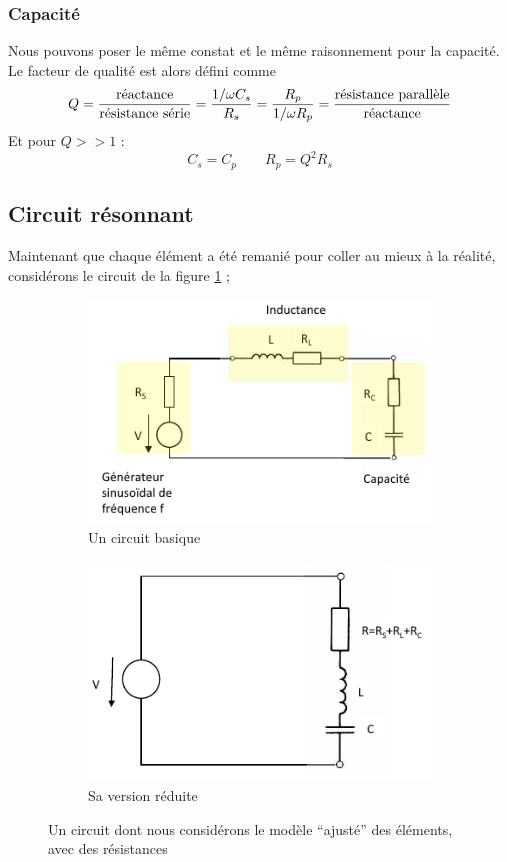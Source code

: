 \documentclass[12pt,a4paper]{article}
\begin{document}
\subsubsection{Capacité}
Nous pouvons poser le même constat et le même raisonnement pour la capacité. Le facteur de qualité est alors défini comme 
\begin{equation}
	Q = \frac{\text{réactance}}{\text{résistance série}} = \frac{1/\omega C_s}{R_s} = \frac{R_p}{1/\omega R_p} = \frac{\text{résistance parallèle}}{\text{réactance}}
\end{equation}
Et pour $Q >> 1$ :
\begin{equation}
	C_s = C_p \qquad R_p = Q^2 R_s
\end{equation}

\subsection{Circuit résonnant}
Maintenant que chaque élément a été remanié pour coller au mieux à la réalité, considérons le circuit de la figure \ref{subfig: circuit resonnant} ;
\begin{figure}
	\begin{subfigure}[b]{0.45\textwidth}
		\centering
		\includegraphics[scale=0.6]{images/circuit_resonnant}
		\caption{Un circuit basique}
		\label{subfig: circuit resonnant}
	\end{subfigure}
	\begin{subfigure}[b]{0.45\textwidth}
		\centering
		\includegraphics[scale=0.6]{images/circuit_resonnant_reduit}
		\caption{Sa version réduite}
	\end{subfigure}
	\caption{Un circuit dont nous considérons le modèle ``ajusté'' des éléments, avec des résistances}
\end{figure}
\end{document}
